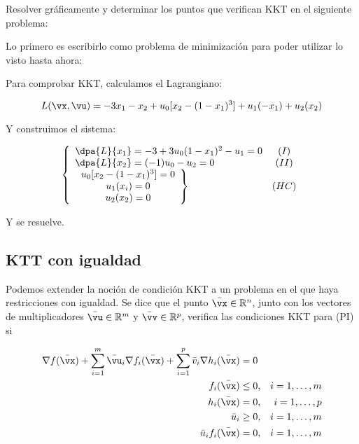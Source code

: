 \begin{example}

Resolver gráficamente y determinar los puntos que verifican KKT en el siguiente problema:

\begin{ioprob}
\end{ioprob}

Lo primero es escribirlo como problema de minimización para poder utilizar lo visto hasta ahora:

\begin{ioprob}
\end{ioprob}

Para comprobar KKT, calculamos el Lagrangiano:

\[
	L(\vx,\vu) = -3x_1 - x_2 + u_0[x_2-(1-x_1)^3] + u_1(-x_1) + u_2(x_2)
\]

Y construimos el sistema:

\[
	\left\{
	\begin{array}{lc}
		\dpa{L}{x_1} = -3 + 3u_0(1-x_1)^2 - u_1 = 0&(I)\\
		\dpa{L}{x_2} = (-1) u_0 - u_2 = 0 & (II)\\
		\left. 
			\begin{array}{c}
				u_0[x_2-(1-x_1)^3] = 0\\
				u_1(x_i) = 0\\
				u_2(x_2) = 0
			\end{array}
			\right\} &(HC)
	\end{array}
	\right.
\]

Y se resuelve.

\end{example}


\subsection{KTT con igualdad}

Podemos extender la noción de condición KKT a un problema en el que haya restricciones con igualdad.
%
Se dice que el punto $\bar{\vx}\in\mathbb{R}^n$, junto con los vectores de multiplicadores $\bar{\vu}\in\mathbb{R}^m$ y $\bar{\vv}\in\mathbb{R}^p$, verifica las condiciones KKT para (PI) si

\begin{align*}
\nabla f(\bar{\vx}) + \sum_{i=1}^m \bar{\vu}_i \nabla f_i(\bar{\vx}) + \sum_{i=1}^p \bar{v}_i\nabla h_i(\bar{\vx}) & = 0 \\
f_i(\bar{\vx}) &\leq 0, & i = 1,\ldots,m \\
h_i(\bar{\vx}) &= 0, & i = 1,\ldots,p \\
\bar{u}_i    & \geq 0, & i = 1,\ldots,m\\
\bar{u}_i f_i(\bar{\vx}) &  = 0, & i = 1,\ldots,m\\
\end{align*}


